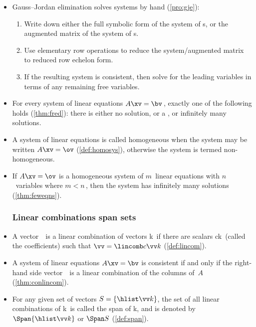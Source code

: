 \begin{itemize}
\item Gauss--Jordan elimination solves systems by hand (\autoref{pro:gje}):
\begin{enumerate}
\item Write down either the full symbolic form of the {system} of s, or the {augmented matrix} of the system of s.
\item Use {elementary row operation}s to reduce the {system}\slash{augmented matrix} to {reduced row echelon form}.
\item If the resulting system is {consistent}, then solve for the leading variables in terms of any remaining {free variable}s.
\end{enumerate}

\item For every system of linear equations \(A\xv=\bv\)\,, exactly one of the following holds (\autoref{thm:fred}): there is either {no solution}, or a , or {infinitely many solutions}.

\item A system of {linear equation}s is called {homogeneous} when the system may be written \(A\xv=\ov\) (\autoref{def:homosys}),
otherwise the system is termed {non-homogeneous}.

\item If \(A\xv=\ov\) is a {homogeneous} system of \(m\)~{linear equation}s with \(n\)~variables where \(m<n\)\,, then the system has {infinitely many solutions} (\autoref{thm:feweqns}).



\subsubsection{Linear combinations span sets}

\item A vector~\vv\ is a {linear combination} of vectors \hlist\vv k\ if there are scalars \hlist ck\ (called the {coefficient}s) such that \(\vv=\lincomb c\vv k\) (\autoref{def:lincom}).

\item A system of {linear equation}s \(A\xv=\bv\) is {consistent} if and only if the right-hand side vector~\bv\ is a {linear combination} of the columns of~\(A\) (\autoref{thm:conlincom}).

\item For any given set of vectors \(S=\{\hlist\vv k\}\), the set of all {linear combination}s of \hlist\vv k\ is called the {span} of \hlist\vv k, and is denoted by \(\Span\{\hlist\vv k\}\) or \(\Span S\) (\autoref{def:span}).

\end{itemize}


\makeanswers
